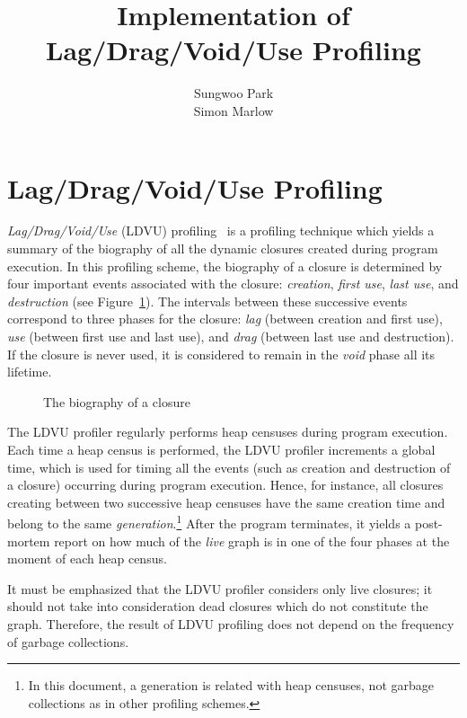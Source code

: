 \documentclass{article}
\begin{document}
\title{Implementation of Lag/Drag/Void/Use Profiling}
\author{Sungwoo Park \\ Simon Marlow}

\makeatactive
\maketitle

\section{Lag/Drag/Void/Use Profiling}

\emph{Lag/Drag/Void/Use} (LDVU) profiling~\cite{RR} is a profiling technique 
which yields a summary of the biography of all the dynamic closures created
during program execution.
In this profiling scheme,
the biography of a closure is determined by four important events associated
with the closure: \emph{creation}, \emph{first use}, 
\emph{last use}, and \emph{destruction} (see Figure~\ref{fig-ldv}).
The intervals between these successive events correspond to three phases
for the closure: \emph{lag} (between creation and first use), 
\emph{use} (between first use and last use), and 
\emph{drag} (between last use and destruction).
If the closure is never used, it is considered to remain in the \emph{void}
phase all its lifetime.

\begin{figure}[ht]
\begin{center}

\caption{The biography of a closure}
\label{fig-ldv}
\end{center}
\end{figure}

The LDVU profiler regularly performs heap censuses during program execution.
Each time a heap census is performed, the LDVU profiler increments a global
time, which is used for timing all the events (such as creation and destruction
of a closure) occurring during program execution.
Hence, for instance, all closures creating between two successive heap censuses
have the same creation time and belong to the same \emph{generation}.\footnote{In
this document, a generation is related with heap censuses, not garbage collections
as in other profiling schemes.}
After the program terminates, it yields a post-mortem report on how much 
of the \emph{live} graph is in one of the four phases at the moment of each 
heap census.

It must be emphasized that the LDVU profiler considers only live closures;
it should not take into consideration dead closures which do not constitute
the graph. Therefore, the result of LDVU profiling does not depend on the
frequency of garbage collections.
\end{document}
